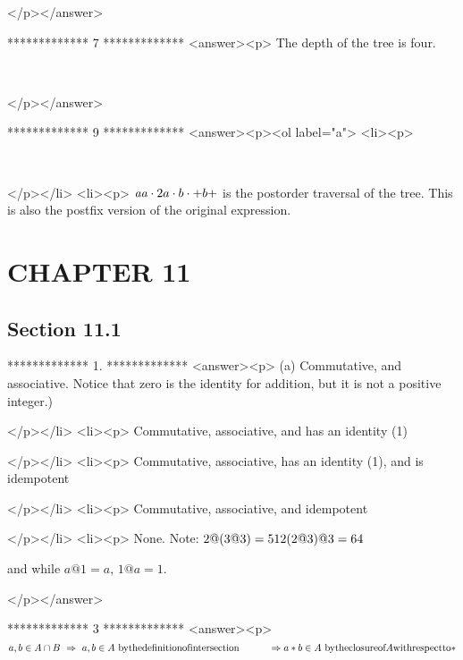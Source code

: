 </p></answer>


*************
7
*************
<answer><p> The depth of the tree is four.

\begin{doublespace}
\noindent\(\)
\end{doublespace}

</p></answer>


*************
9
*************
<answer><p><ol label="a">
<li><p>

\begin{doublespace}
\noindent\(\)
\end{doublespace}

</p></li>
<li><p>   \(\text{\textit{aa}}\cdot 2a\cdot b\cdot +b+\) is the postorder traversal of the tree. This is also the postfix version of the original expression.


\section{CHAPTER 11}


\subsection{Section 11.1}

*************
1.
*************
<answer><p> (a) Commutative, and associative. Notice that zero is the identity for addition, but it is not a positive integer.)

</p></li>
<li><p> Commutative, associative, and has an  identity (1)

</p></li>
<li><p> Commutative, associative, has an identity (1), and is idempotent

</p></li>
<li><p> Commutative, associative, and idempotent

</p></li>
<li><p>  None. Note:   \(2 @ (3 @ 3) = 512 \\
\\
 (2 @ 3) @ 3 = 64\)



        and while \(a @ 1 = a\), \(1 @ a = 1\).

</p></answer>


*************
3
*************
<answer><p>  \(a, b \in  A \cap  B\text{  }\Rightarrow \text{  }a, b \in  A\text{  }\text{by} \text{the} \text{definition} \text{of} \text{intersection}\\
\\
\quad \quad \quad \Rightarrow  a*b\in A\text{   }\text{by} \text{the} \text{closure} \text{of} A \text{with} \text{respect} \text{to} *\) 



